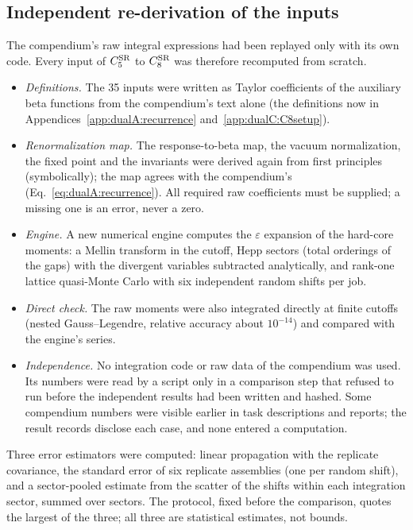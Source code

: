 \documentclass[11pt,a4paper]{article}
\numberwithin{equation}{section}
\newcommand{\CSR}{C^{\rm SR}}
\begin{document}
\subsection{Independent re-derivation of the inputs}\label{sec:indep}
The compendium's raw integral expressions had been replayed only with its own code. Every input of $\CSR_5$ to
$\CSR_8$ was therefore recomputed from scratch.
\begin{itemize}
\item \emph{Definitions.} The 35 inputs were written as Taylor coefficients of the auxiliary beta functions from the
 compendium's text alone (the definitions now in Appendices~\ref{app:dualA:recurrence} and~\ref{app:dualC:C8setup}).
\item \emph{Renormalization map.} The response-to-beta map, the vacuum normalization, the fixed point and the
 invariants were derived again from first principles (symbolically); the map agrees with the compendium's (Eq.~\eqref{eq:dualA:recurrence}). All
 required raw coefficients must be supplied; a missing one is an error, never a zero.
\item \emph{Engine.} A new numerical engine computes the $\varepsilon$ expansion of the hard-core moments: a Mellin
 transform in the cutoff, Hepp sectors (total orderings of the gaps) with the divergent variables subtracted
 analytically, and rank-one lattice quasi-Monte Carlo with six independent random shifts per job.
\item \emph{Direct check.} The raw moments were also integrated directly at finite cutoffs (nested Gauss--Legendre,
 relative accuracy about $10^{-14}$) and compared with the engine's series.
\item \emph{Independence.} No integration code or raw data of the compendium was used. Its numbers were read by a
 script only in a comparison step that refused to run before the independent results had been written and hashed.
 Some compendium numbers were visible earlier in task descriptions and reports; the result records disclose each
 case, and none entered a computation.
\end{itemize}
Three error estimators were computed: linear propagation with the replicate covariance, the standard error of six
replicate assemblies (one per random shift), and a sector-pooled estimate from the scatter of the shifts within each
integration sector, summed over sectors. The protocol, fixed before the comparison, quotes the largest of the three;
all three are statistical estimates, not bounds.
\end{document}
